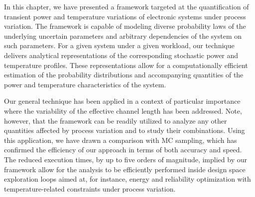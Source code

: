 In this chapter, we have presented a framework targeted at the quantification of
transient power and temperature variations of electronic systems under process
variation. The framework is capable of modeling diverse probability laws of the
underlying uncertain parameters and arbitrary dependencies of the system on such
parameters. For a given system under a given workload, our technique delivers
analytical representations of the corresponding stochastic power and temperature
profiles. These representations allow for a computationally efficient estimation
of the probability distributions and accompanying quantities of the power and
temperature characteristics of the system.

Our general technique has been applied in a context of particular importance
where the variability of the effective channel length has been addressed. Note,
however, that the framework can be readily utilized to analyze any other
quantities affected by process variation and to study their combinations. Using
this application, we have drawn a comparison with \ac{MC} sampling, which has
confirmed the efficiency of our approach in terms of both accuracy and speed.
The reduced execution times, by up to five orders of magnitude, implied by our
framework allow for the analysis to be efficiently performed inside design space
exploration loops aimed at, for instance, energy and reliability optimization
with temperature-related constraints under process variation.
